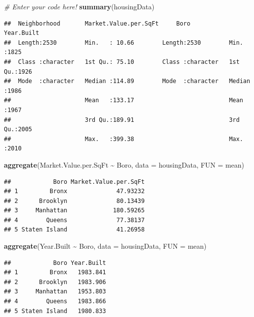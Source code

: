 \documentclass[
]{article}
\newenvironment{Shaded}{\begin{snugshade}}{\end{snugshade}}
\newcommand{\AttributeTok}[1]{\textcolor[rgb]{0.13,0.29,0.53}{#1}}
\newcommand{\CommentTok}[1]{\textcolor[rgb]{0.56,0.35,0.01}{\textit{#1}}}
\newcommand{\FunctionTok}[1]{\textcolor[rgb]{0.13,0.29,0.53}{\textbf{#1}}}
\newcommand{\NormalTok}[1]{#1}
\newcommand{\SpecialCharTok}[1]{\textcolor[rgb]{0.81,0.36,0.00}{\textbf{#1}}}
\begin{document}
\begin{Shaded}
\begin{Highlighting}[]
\CommentTok{\# Enter your code here!}
\FunctionTok{summary}\NormalTok{(housingData)}
\end{Highlighting}
\end{Shaded}

\begin{verbatim}
##  Neighborhood       Market.Value.per.SqFt     Boro             Year.Built  
##  Length:2530        Min.   : 10.66        Length:2530        Min.   :1825  
##  Class :character   1st Qu.: 75.10        Class :character   1st Qu.:1926  
##  Mode  :character   Median :114.89        Mode  :character   Median :1986  
##                     Mean   :133.17                           Mean   :1967  
##                     3rd Qu.:189.91                           3rd Qu.:2005  
##                     Max.   :399.38                           Max.   :2010
\end{verbatim}

\begin{Shaded}
\begin{Highlighting}[]
\FunctionTok{aggregate}\NormalTok{(Market.Value.per.SqFt }\SpecialCharTok{\textasciitilde{}}\NormalTok{ Boro, }\AttributeTok{data =}\NormalTok{ housingData, }\AttributeTok{FUN =}\NormalTok{ mean)}
\end{Highlighting}
\end{Shaded}

\begin{verbatim}
##            Boro Market.Value.per.SqFt
## 1         Bronx              47.93232
## 2      Brooklyn              80.13439
## 3     Manhattan             180.59265
## 4        Queens              77.38137
## 5 Staten Island              41.26958
\end{verbatim}

\begin{Shaded}
\begin{Highlighting}[]
\FunctionTok{aggregate}\NormalTok{(Year.Built }\SpecialCharTok{\textasciitilde{}}\NormalTok{ Boro, }\AttributeTok{data =}\NormalTok{ housingData, }\AttributeTok{FUN =}\NormalTok{ mean)}
\end{Highlighting}
\end{Shaded}

\begin{verbatim}
##            Boro Year.Built
## 1         Bronx   1983.841
## 2      Brooklyn   1983.906
## 3     Manhattan   1953.803
## 4        Queens   1983.866
## 5 Staten Island   1980.833
\end{verbatim}
\end{document}
